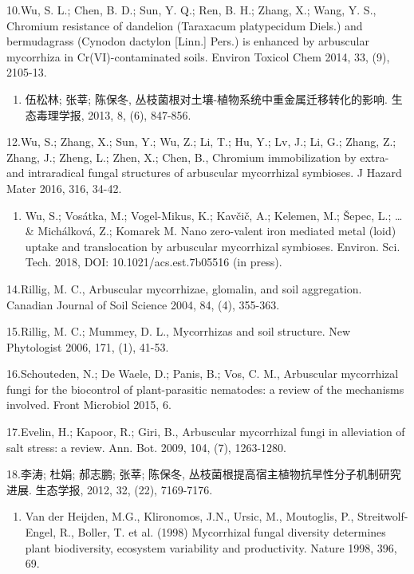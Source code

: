 \documentclass[]{book}
\providecommand{\tightlist}{%
  \setlength{\itemsep}{0pt}\setlength{\parskip}{0pt}}
\begin{document}
10.Wu, S. L.; Chen, B. D.; Sun, Y. Q.; Ren, B. H.; Zhang, X.; Wang, Y.
S., Chromium resistance of dandelion (Taraxacum platypecidum Diels.) and
bermudagrass (Cynodon dactylon {[}Linn.{]} Pers.) is enhanced by
arbuscular mycorrhiza in Cr(VI)-contaminated soils. Environ Toxicol Chem
2014, 33, (9), 2105-13.

\begin{enumerate}
\def\labelenumi{\arabic{enumi}.}
\setcounter{enumi}{10}
\tightlist
\item
  伍松林; 张莘; 陈保冬, 丛枝菌根对土壤-植物系统中重金属迁移转化的影响.
  生态毒理学报, 2013, 8, (6), 847-856.
\end{enumerate}

12.Wu, S.; Zhang, X.; Sun, Y.; Wu, Z.; Li, T.; Hu, Y.; Lv, J.; Li, G.;
Zhang, Z.; Zhang, J.; Zheng, L.; Zhen, X.; Chen, B., Chromium
immobilization by extra- and intraradical fungal structures of
arbuscular mycorrhizal symbioses. J Hazard Mater 2016, 316, 34-42.

\begin{enumerate}
\def\labelenumi{\arabic{enumi}.}
\setcounter{enumi}{12}
\tightlist
\item
  Wu, S.; Vosátka, M.; Vogel-Mikus, K.; Kavčič, A.; Kelemen, M.; Šepec,
  L.; \ldots{} \& Michálková, Z.; Komarek M. Nano zero-valent iron
  mediated metal (loid) uptake and translocation by arbuscular
  mycorrhizal symbioses. Environ. Sci. Tech. 2018, DOI:
  10.1021/acs.est.7b05516 (in press).
\end{enumerate}

14.Rillig, M. C., Arbuscular mycorrhizae, glomalin, and soil
aggregation. Canadian Journal of Soil Science 2004, 84, (4), 355-363.

15.Rillig, M. C.; Mummey, D. L., Mycorrhizas and soil structure. New
Phytologist 2006, 171, (1), 41-53.

16.Schouteden, N.; De Waele, D.; Panis, B.; Vos, C. M., Arbuscular
mycorrhizal fungi for the biocontrol of plant-parasitic nematodes: a
review of the mechanisms involved. Front Microbiol 2015, 6.

17.Evelin, H.; Kapoor, R.; Giri, B., Arbuscular mycorrhizal fungi in
alleviation of salt stress: a review. Ann. Bot. 2009, 104, (7),
1263-1280.

18.李涛; 杜娟; 郝志鹏; 张莘; 陈保冬,
丛枝菌根提高宿主植物抗旱性分子机制研究进展. 生态学报, 2012, 32, (22),
7169-7176.

\begin{enumerate}
\def\labelenumi{\arabic{enumi}.}
\setcounter{enumi}{18}
\tightlist
\item
  Van der Heijden, M.G., Klironomos, J.N., Ursic, M., Moutoglis, P.,
  Streitwolf-Engel, R., Boller, T. et al. (1998) Mycorrhizal fungal
  diversity determines plant biodiversity, ecosystem variability and
  productivity. Nature 1998, 396, 69.
\end{enumerate}
\end{document}
